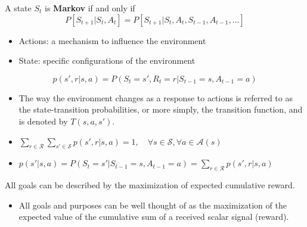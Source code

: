 \begin{definition}
	A state $S_t$ is \textbf{Markov} if and only if 
	$$P[S_{t+1}|S_t, A_t] = P[S_{t+1}|S_t, A_t, S_{t-1},A_{t-1},...]$$
\end{definition}
\begin{itemize}
	\item Actions: a mechanism to influence the environment
	\item State: specific configurations of the environment
\end{itemize}

\begin{definition}
	$$p(s',r|s,a) = P(S_t=s',R_t=r|S_{t-1}=s,A_{t-1}=a)$$
\end{definition}
\begin{itemize}
	\item The way the environment changes as a response to actions is referred to as the state-transition probabilities, or more simply, the transition function, and is denoted by $T(s,a,s')$.
	\item $\sum_{r\in \mathcal{R}}\sum_{s'\in \mathcal{S}}p(s',r|s,a) = 1, \quad \forall s \in \mathcal{S}, \forall a\in \mathcal{A}(s)$
	\item $p(s'|s,a)=P(S_t=s'|S_{t-1}=s,A_{t-1}=a)=\sum_{r\in \mathcal{R}}p(s',r|s,a)$
\end{itemize}

\begin{definition}
	All goals can be described by the maximization of expected cumulative reward.
\end{definition}
\begin{itemize}
	\item All goals and purposes can be well thought of as the maximization of the expected value of the cumulative sum of a received scalar signal (\ie reward).
\end{itemize}

